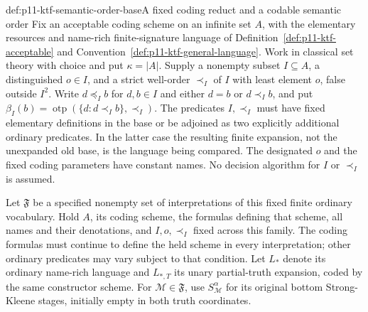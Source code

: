 \begin{hbconvention}{def:p11-ktf-semantic-order-base}{A fixed coding reduct and a codable semantic order}
Fix an acceptable coding scheme on an infinite set \(A\), with the
elementary resources and name-rich finite-signature language of
Definition~\ref{def:p11-ktf-acceptable} and
Convention~\ref{def:p11-ktf-general-language}. Work in classical set
theory with choice and put \(\kappa=\lvert A\rvert\).
Supply a nonempty subset \(I\subseteq A\), a distinguished
\(o\in I\), and a strict well-order \(\prec_I\) of \(I\)
with least element \(o\), false outside \(I^2\). Write
\(d\preceq_I b\) for \(d,b\in I\) and either \(d=b\)
or \(d\prec_I b\), and put
\(\beta_I(b)=\operatorname{otp}(\{d:d\prec_I b\},\prec_I)\).
The predicates \(I,\prec_I\) must have fixed elementary
definitions in the base or be adjoined as two explicitly additional
ordinary predicates. In the latter case the resulting finite expansion,
not the unexpanded old base, is the language being compared. The
designated \(o\) and the fixed coding parameters have constant names.
No decision algorithm for \(I\) or \(\prec_I\) is assumed.

Let \(\mathfrak F\) be a specified nonempty set of interpretations
of this fixed finite ordinary vocabulary. Hold \(A\), its coding
scheme, the formulas defining that scheme, all names and their denotations,
and \(I,o,\prec_I\) fixed across this family. The coding formulas
must continue to define the held scheme in every interpretation; other
ordinary predicates may vary subject to that condition. Let
\(L_*\) denote its ordinary name-rich language and \(L_{*,T}\)
its unary partial-truth expansion, coded by the same constructor scheme.
For \(\mathcal M\in\mathfrak F\), use
\(S_{\mathcal M}^{\alpha}\) for its original bottom
Strong-Kleene stages, initially empty in both truth coordinates.
\end{hbconvention}

